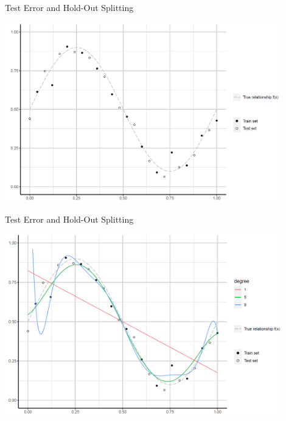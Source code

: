 \begin{frame}{Test Error and Hold-Out Splitting}

\scriptsize

\begin{center}
\includegraphics[width=0.9\textwidth]{plots/test_error01.png}
\end{center}

\normalsize 

\end{frame}

\begin{frame}{Test Error and Hold-Out Splitting}

\scriptsize

\begin{center}
\includegraphics[width=0.9\textwidth]{plots/test_error02.png}
\end{center}

\normalsize 

\end{frame}

